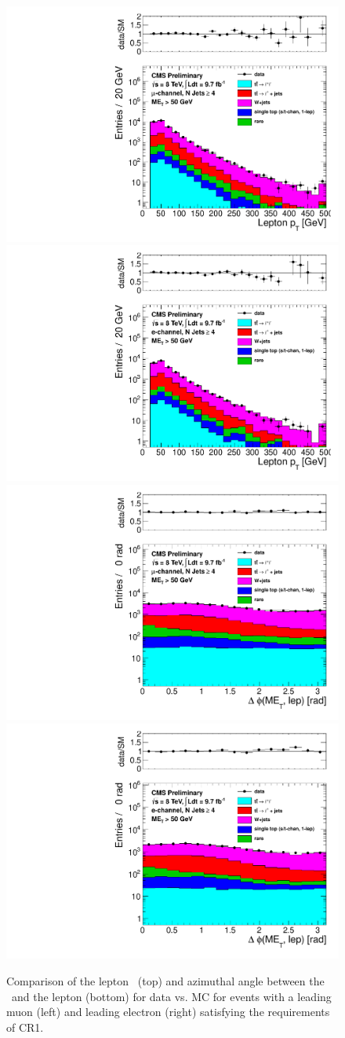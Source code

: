 \begin{figure}[hbt]
  \begin{center}
        \includegraphics[width=0.5\linewidth]{plots/CR1plots/leppt_met50_leadmuo_nj4.pdf}%
        \includegraphics[width=0.5\linewidth]{plots/CR1plots/leppt_met50_leadele_nj4.pdf}
        \includegraphics[width=0.5\linewidth]{plots/CR1plots/dphi_metlep_met50_leadmuo_nj4.pdf}%
        \includegraphics[width=0.5\linewidth]{plots/CR1plots/dphi_metlep_met50_leadele_nj4.pdf}
    \caption{
      Comparison of the lepton \pt\ (top) and azimuthal angle between the \met\ and the lepton (bottom) for 
      data vs. MC for events with a leading muon (left) and leading electron (right)
      satisfying the requirements of CR1. 
\label{fig:cr1lepptdphi} 
}  
      \end{center}
\end{figure}

